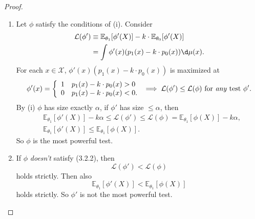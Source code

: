 \documentclass[a4paper]{article}
\begin{document}
\begin{proof}
\begin{enumerate}
\begin{center}
		\end{center}
		\item Let $\phi$ satisfy the conditions of (i). Consider
		\begin{equation}
			\begin{aligned}
				\mathcal{L}(\phi') &\equiv \mathbb{E}_{\theta_1}[\phi'(X)] - k\cdot\mathbb{E}_{\theta_0}[\phi'(X)] \\
				&= \int \phi'(x) (p_1(x) - k \cdot p_0(x)) \d \mu (x).
			\end{aligned}
		\end{equation}
		For each $x \in \mathcal{X}$, $\phi'(x)(p_1(x) - k \cdot p_0(x))$ is maximized at
		\begin{equation*}
			\phi'(x) =\left\{ 
			\begin{array}{ll}
				1 & p_1(x) - k \cdot p_0(x) > 0 \\
				0 & p_1(x) - k \cdot p_0(x) < 0.
			\end{array} \right. \implies \mathcal{L}(\phi') \leq \mathcal{L}(\phi) \text{ for \emph{any} test } \phi'.
		\end{equation*}
		By (i) $\phi$ has size exactly $\alpha$, if $\phi'$ has size $\leq \alpha$, then
		\begin{equation}
			\begin{aligned}
				& \mathbb{E}_{\theta_1}[\phi'(X)] - k\alpha \leq \mathcal{L}(\phi') \leq \mathcal{L}(\phi) = \mathbb{E}_{\theta_1}[\phi(X)] - k\alpha, \\
				& \mathbb{E}_{\theta_1}[\phi'(X)] \leq \mathbb{E}_{\theta_1}[\phi(X)].
			\end{aligned}
		\end{equation}
		So $\phi$ is the most powerful test.
		\item If $\phi$ \emph{doesn't} satisfy (3.2.2), then
		\begin{equation}
			\mathcal{L}(\phi') < \mathcal{L}(\phi)
		\end{equation}
		holds strictly. Then also
		\begin{equation}
			\mathbb{E}_{\theta_1}[\phi'(X)] < \mathbb{E}_{\theta_1}[\phi(X)]
		\end{equation}
		holds strictly. So $\phi'$ is not the most powerful test.
	\end{enumerate}
\end{proof}
\end{document}
